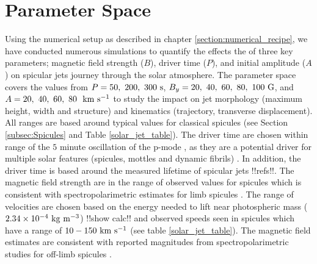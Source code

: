 \documentclass[12pt]{ociamthesis}
\newcommand{\kms}{~\rm{km ~s^{-1}}}
\begin{document}
\section{Parameter Space}
\label{subsec:paramater_space}
Using the numerical setup as described in chapter \ref{section:numerical_recipe}, we have conducted numerous simulations to quantify the effects the of three key parameters; magnetic field strength ($B$), driver time ($P$), and initial amplitude ($A$) on spicular jets journey through the solar atmosphere. The parameter space covers the values from $P=50,~200,~300~\rm{s}$, $B_y=20,~40,~60,~80,~100~\rm{G}$, and $A=20,~40,~60,~80~\kms$ to study the impact on jet morphology (maximum height, width and structure) and kinematics (trajectory, transverse displacement). All ranges are based around typical values for classical spicules (see Section \ref{subsec:Spicules} and Table \ref{solar_jet_table}). The driver time are chosen within range of the $5$ minute oscillation of the p-mode \citep{Leighton1962ApJ135474L}, as they are a potential driver for multiple solar features (spicules, mottles  and dynamic fibrils) \citep{Pontieu2004Natur}. In addition, the driver time is based around the measured lifetime of spicular jets {\color{green}!!refs!!}. The magnetic field strength are in the range of observed values for spicules which is consistent with spectropolarimetric estimates for limb spicules \citep{centeno2010, suarez2015}. The range of velocities are chosen based on the energy needed to lift near photospheric mass ($2.34\times10^{-4}~\rm{kg~m^{-3}}$) {\color{green}!!show calc!!} and observed speeds seen in spicules which have a range of $10-150\kms$ (see table \ref{solar_jet_table}). The magnetic field estimates are consistent with reported magnitudes from spectropolarimetric studies for off-limb spicules \citep{centeno2010, suarez2015}.
\end{document}
